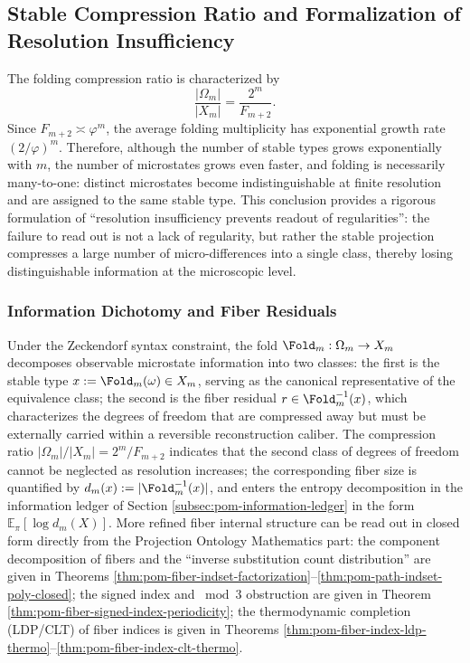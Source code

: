\subsection{Stable Compression Ratio and Formalization of Resolution Insufficiency}\label{subsec:folding-stable-compression-resolution}

The folding compression ratio is characterized by
\[
\frac{|\Omega_m|}{|X_m|}=\frac{2^m}{F_{m+2}}.
\]
Since $F_{m+2}\asymp \varphi^m$, the average folding multiplicity has exponential growth rate $(2/\varphi)^m$. Therefore, although the number of stable types grows exponentially with $m$, the number of microstates grows even faster, and folding is necessarily many-to-one: distinct microstates become indistinguishable at finite resolution and are assigned to the same stable type. This conclusion provides a rigorous formulation of ``resolution insufficiency prevents readout of regularities'': the failure to read out is not a lack of regularity, but rather the stable projection compresses a large number of micro-differences into a single class, thereby losing distinguishable information at the microscopic level.

\subsubsection{Information Dichotomy and Fiber Residuals}
Under the Zeckendorf syntax constraint, the fold $\Fold_m:\Omega_m\to X_m$ decomposes observable microstate information into two classes: the first is the stable type $x:=\Fold_m(\omega)\in X_m$, serving as the canonical representative of the equivalence class; the second is the fiber residual $r\in \Fold_m^{-1}(x)$, which characterizes the degrees of freedom that are compressed away but must be externally carried within a reversible reconstruction caliber. The compression ratio $|\Omega_m|/|X_m|=2^m/F_{m+2}$ indicates that the second class of degrees of freedom cannot be neglected as resolution increases; the corresponding fiber size is quantified by $d_m(x):=|\Fold_m^{-1}(x)|$, and enters the entropy decomposition in the information ledger of Section \ref{subsec:pom-information-ledger} in the form $\mathbb{E}_{\pi}[\log d_m(X)]$. More refined fiber internal structure can be read out in closed form directly from the Projection Ontology Mathematics part: the component decomposition of fibers and the ``inverse substitution count distribution'' are given in Theorems \ref{thm:pom-fiber-indset-factorization}--\ref{thm:pom-path-indset-poly-closed}; the signed index and \(\bmod 3\) obstruction are given in Theorem \ref{thm:pom-fiber-signed-index-periodicity}; the thermodynamic completion (LDP/CLT) of fiber indices is given in Theorems \ref{thm:pom-fiber-index-ldp-thermo}--\ref{thm:pom-fiber-index-clt-thermo}.
